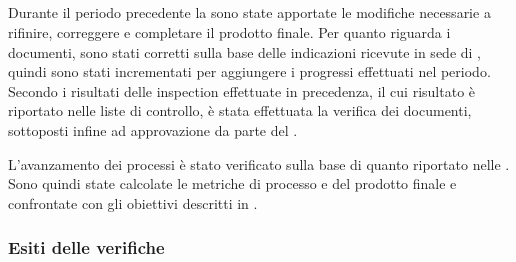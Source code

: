 \subsection{\RA{}}
Durante il periodo precedente la \RA{} sono state apportate le modifiche necessarie a rifinire, correggere e completare il prodotto finale.
Per quanto riguarda i documenti, sono stati corretti sulla base delle indicazioni ricevute in sede di \RQ{}, quindi sono stati incrementati per aggiungere i progressi effettuati nel periodo. Secondo i risultati delle inspection effettuate in precedenza, il cui risultato è riportato nelle liste di controllo, è stata effettuata la verifica dei documenti, sottoposti infine ad approvazione da parte del \Responsabile{}.

L'avanzamento dei processi è stato verificato sulla base di quanto riportato nelle \NormeDiProgetto{}. Sono quindi state calcolate le metriche di processo e del prodotto finale e confrontate con gli obiettivi descritti in .

\subsubsection{Esiti delle verifiche}
